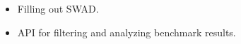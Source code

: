 \begin{itemize}
    \item Filling out SWAD.
    \item API for filtering and analyzing benchmark results.
\end{itemize}